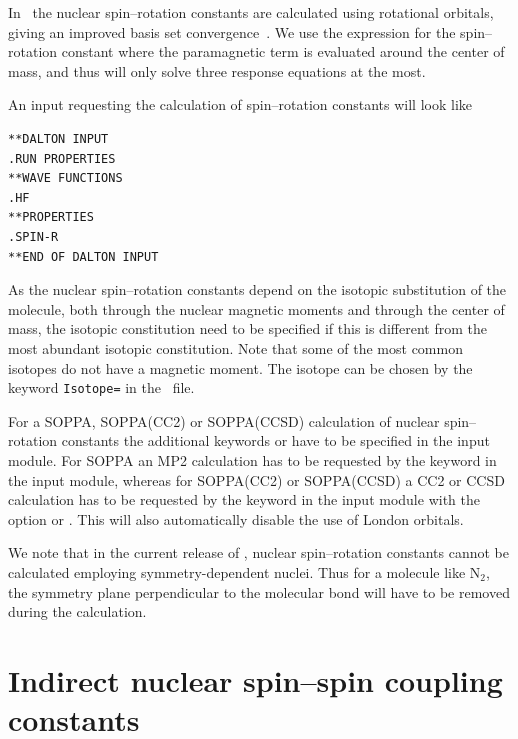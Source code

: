 In \dalton\ the nuclear spin--rotation
constants are calculated using
rotational orbitals, giving an improved
basis set convergence~\cite{jgkrthjcp105}. We use the
expression for the spin--rotation constant where the paramagnetic term
is evaluated around the center of mass, and thus will only solve three
response equations at the most.

An input requesting the calculation of spin--rotation constants will
look like

\begin{verbatim}
**DALTON INPUT
.RUN PROPERTIES
**WAVE FUNCTIONS
.HF
**PROPERTIES
.SPIN-R
**END OF DALTON INPUT
\end{verbatim}

As the nuclear spin--rotation constants
depend on the isotopic substitution of
the molecule, both through the nuclear magnetic moments and through the
center of mass, the isotopic constitution need to be specified if this
is different  from the most abundant isotopic constitution. Note that
some of the most common isotopes do not have a magnetic moment. The isotope can be chosen by the keyword \verb|Isotope=| in the \molinp\ file.

For a SOPPA, SOPPA(CC2) or
SOPPA(CCSD) calculation of nuclear spin--rotation
constants the additional keywords  or  have
to be specified in the  input module. For SOPPA an MP2
calculation has to be requested by the keyword  in the
 input module, whereas for SOPPA(CC2) or
SOPPA(CCSD) a CC2 or CCSD calculation has to be requested by the
keyword  in the  input module with the  option
 or . This will also automatically disable
the use of London orbitals.

We note that in the current release of \dalton, nuclear spin--rotation
constants cannot be calculated employing symmetry-dependent nuclei.
Thus for a molecule like N$_2$, the symmetry plane perpendicular to the
molecular bond will have to be removed during the calculation.

\section{Indirect nuclear spin--spin coupling
constants}\label{sec:spinspin}

